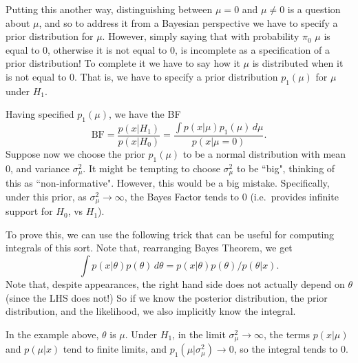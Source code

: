 \documentclass[12pt]{article}
\begin{document}
Putting this another way, distinguishing between
$\mu=0$ and $\mu \neq 0$ is a question about $\mu$, and so to address it from a Bayesian perspective we have to specify a prior distribution for $\mu$. However, simply saying that with probability $\pi_0$ $\mu$ is equal to 0, otherwise
it is not equal to 0, is incomplete as a specification
of a prior distribution! To complete it we have to say how it $\mu$ is distributed when it is not equal to 0. That is, we have to specify a prior distribution $p_1(\mu)$ for $\mu$ under $H_1$.

Having specified $p_1(\mu)$, we have the BF
$$\text{BF} = \frac{p(x | H_1)}{p(x|H_0)} = \frac{\int p(x | \mu) p_1(\mu) \, d\mu}{p(x | \mu=0)}.$$
Suppose now we choose the prior $p_1(\mu)$ to be a normal distribution with mean 0, and variance 
$\sigma_\mu^2$. It might be tempting to choose $\sigma_\mu^2$ to be ``big", thinking of this as ``non-informative". However, this would be a big mistake. Specifically, under this prior, as $\sigma_\mu^2 \rightarrow \infty$, the Bayes Factor tends to 0 (i.e.~provides infinite support for $H_0$, vs $H_1$).

To prove this, we can use the following trick
that can be useful for computing integrals of this sort. Note that, rearranging Bayes Theorem,
we get
$$\int p(x | \theta) p(\theta) \,d\theta = p(x | \theta) p(\theta) / p(\theta | x).$$
Note that, despite appearances, the right hand side does not actually depend on $\theta$ (since the LHS does not!) So if we know the posterior distribution, the prior distribution, and the likelihood, we also implicitly know the integral.

In the example above, $\theta$ is $\mu$.
Under $H_1$, in the limit $\sigma_\mu^2 \rightarrow \infty$, the terms $p(x | \mu)$ and $p(\mu | x)$ tend to finite limits, and $p_1(\mu | \sigma_\mu^2) \rightarrow 0$, so the integral tends to 0.







\end{document}
